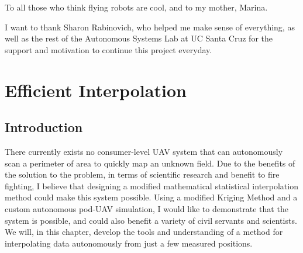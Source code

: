 \documentclass[11pt]{ucthesis}
\begin{document}
\begin{frontmatter}
\begin{dedication}
\null\vfil
{\large
\begin{center}
To all those who think flying robots are cool, and to my mother, Marina.
\vspace{12pt}
\end{center}}
\vfil\null
\end{dedication}


\begin{acknowledgements}
I want to thank Sharon Rabinovich, who helped me make sense of everything, as well as the rest of the Autonomous Systems Lab at UC Santa Cruz for the support and motivation to continue this project everyday.
\end{acknowledgements}

\end{frontmatter}

\part{Efficient Interpolation}

\chapter{Introduction}
There currently exists no consumer-level UAV system that can autonomously scan a perimeter of area to quickly map an unknown field. Due to the benefits of the solution to the problem, in terms of scientific research and benefit to fire fighting, I believe that designing a modified mathematical statistical interpolation method could make this system possible. Using a modified Kriging Method and a custom autonomous pod-UAV simulation, I would like to demonstrate that the system is possible, and could also benefit a variety of civil servants and scientists. We will, in this chapter, develop the tools and understanding of a method for interpolating data autonomously from just a few measured positions.
\end{document}
